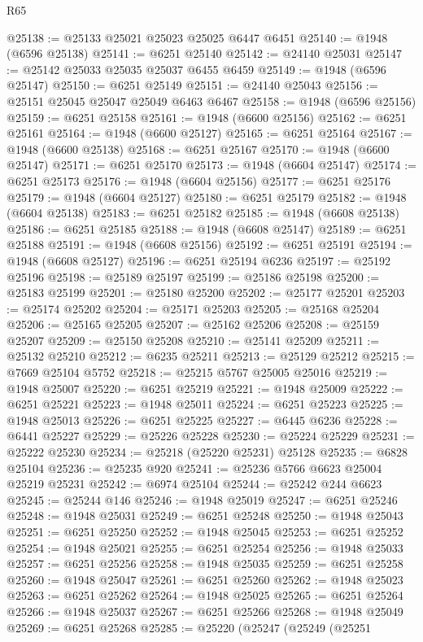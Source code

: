 \begin{lexlean}{R65}
\begin{coremodule}
{@25138 := @25133 @25021 @25023 @25025 @6447 @6451
@25140 := @1948 (@6596 @25138)
@25141 := @6251 @25140
@25142 := @24140 @25031
@25147 := @25142 @25033 @25035 @25037 @6455 @6459
@25149 := @1948 (@6596 @25147)
@25150 := @6251 @25149
@25151 := @24140 @25043
@25156 := @25151 @25045 @25047 @25049 @6463 @6467
@25158 := @1948 (@6596 @25156)
@25159 := @6251 @25158
@25161 := @1948 (@6600 @25156)
@25162 := @6251 @25161
@25164 := @1948 (@6600 @25127)
@25165 := @6251 @25164
@25167 := @1948 (@6600 @25138)
@25168 := @6251 @25167
@25170 := @1948 (@6600 @25147)
@25171 := @6251 @25170
@25173 := @1948 (@6604 @25147)
@25174 := @6251 @25173
@25176 := @1948 (@6604 @25156)
@25177 := @6251 @25176
@25179 := @1948 (@6604 @25127)
@25180 := @6251 @25179
@25182 := @1948 (@6604 @25138)
@25183 := @6251 @25182
@25185 := @1948 (@6608 @25138)
@25186 := @6251 @25185
@25188 := @1948 (@6608 @25147)
@25189 := @6251 @25188
@25191 := @1948 (@6608 @25156)
@25192 := @6251 @25191
@25194 := @1948 (@6608 @25127)
@25196 := @6251 @25194 @6236
@25197 := @25192 @25196
@25198 := @25189 @25197
@25199 := @25186 @25198
@25200 := @25183 @25199
@25201 := @25180 @25200
@25202 := @25177 @25201
@25203 := @25174 @25202
@25204 := @25171 @25203
@25205 := @25168 @25204
@25206 := @25165 @25205
@25207 := @25162 @25206
@25208 := @25159 @25207
@25209 := @25150 @25208
@25210 := @25141 @25209
@25211 := @25132 @25210
@25212 := @6235 @25211
@25213 := @25129 @25212
@25215 := @7669 @25104 @5752
@25218 := @25215 @5767 @25005 @25016
@25219 := @1948 @25007
@25220 := @6251 @25219
@25221 := @1948 @25009
@25222 := @6251 @25221
@25223 := @1948 @25011
@25224 := @6251 @25223
@25225 := @1948 @25013
@25226 := @6251 @25225
@25227 := @6445 @6236
@25228 := @6441 @25227
@25229 := @25226 @25228
@25230 := @25224 @25229
@25231 := @25222 @25230
@25234 := @25218 (@25220 @25231) @25128
@25235 := @6828 @25104
@25236 := @25235 @920
@25241 := @25236 @5766 @6623 @25004 @25219 @25231
@25242 := @6974 @25104
@25244 := @25242 @244 @6623
@25245 := @25244 @146
@25246 := @1948 @25019
@25247 := @6251 @25246
@25248 := @1948 @25031
@25249 := @6251 @25248
@25250 := @1948 @25043
@25251 := @6251 @25250
@25252 := @1948 @25045
@25253 := @6251 @25252
@25254 := @1948 @25021
@25255 := @6251 @25254
@25256 := @1948 @25033
@25257 := @6251 @25256
@25258 := @1948 @25035
@25259 := @6251 @25258
@25260 := @1948 @25047
@25261 := @6251 @25260
@25262 := @1948 @25023
@25263 := @6251 @25262
@25264 := @1948 @25025
@25265 := @6251 @25264
@25266 := @1948 @25037
@25267 := @6251 @25266
@25268 := @1948 @25049
@25269 := @6251 @25268
@25285 := @25220
    (@25247
      (@25249
        (@25251
}
\end{coremodule}
\end{lexlean}
